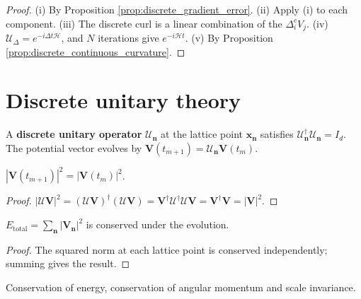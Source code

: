 \begin{proof}
(i) By Proposition \ref{prop:discrete_gradient_error}. (ii) Apply (i) to each component. (iii) The discrete curl is a linear combination of the $\Delta_i^cV_j$. (iv) $\mathcal{U}_{\Delta}=e^{-i\Delta t\mathcal{H}}$, and $N$ iterations give $e^{-i\mathcal{H}t}$. (v) By Proposition \ref{prop:discrete_continuous_curvature}.
\end{proof}

\section{Discrete unitary theory}\label{sec:discrete_unitary_theory}

\begin{definition}\label{def:discrete_unitary}
A \textbf{discrete unitary operator} $\mathcal{U}_{\mathbf{n}}$ at the lattice point $\mathbf{x}_{\mathbf{n}}$ satisfies $\mathcal{U}_{\mathbf{n}}^\dagger\mathcal{U}_{\mathbf{n}}=I_d$. The potential vector evolves by $\mathbf{V}(t_{m+1})=\mathcal{U}_{\mathbf{n}}\mathbf{V}(t_m)$.
\end{definition}

\begin{proposition}\label{prop:unitary_norm_conservation}
$|\mathbf{V}(t_{m+1})|^2=|\mathbf{V}(t_m)|^2$.
\end{proposition}

\begin{proof}
$|\mathcal{U}\mathbf{V}|^2=(\mathcal{U}\mathbf{V})^\dagger(\mathcal{U}\mathbf{V})=\mathbf{V}^\dagger\mathcal{U}^\dagger\mathcal{U}\mathbf{V}=\mathbf{V}^\dagger\mathbf{V}=|\mathbf{V}|^2$.
\end{proof}

\begin{proposition}\label{prop:unitary_total_energy}
$E_{\text{total}}=\sum_{\mathbf{n}}|\mathbf{V}_{\mathbf{n}}|^2$ is conserved under the evolution.
\end{proposition}

\begin{proof}
The squared norm at each lattice point is conserved independently; summing gives the result.
\end{proof}

\begin{proposition}\label{prop:unitary_conservation_laws}
Conservation of energy, conservation of angular momentum and scale invariance.
\end{proposition}

